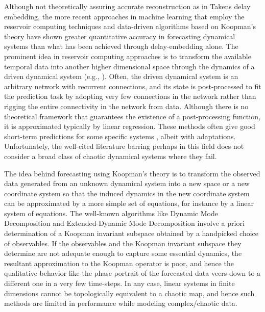 \documentclass[12 pt]{article}
\begin{document}
Although not theoretically assuring accurate reconstruction as in Takens delay embedding, the more recent approaches in machine learning that employ the reservoir computing techniques \cite{jaeger2004harnessing, lu2018attractor} and data-driven algorithms based on Koopman's theory \cite{koopman1932dynamical,budivsic2012applied}  have shown greater quantitative accuracy in forecasting dynamical systems than what has been achieved through delay-embedding alone. The prominent idea in reservoir computing approaches is to transform the available temporal data into another higher dimensional space through the dynamics of a driven dynamical system (e.g., \cite{Manju_ESP,manjunath2020stability}).  Often, the driven dynamical system is an arbitrary network with recurrent connections, and its state is post-processed to fit the prediction task by adopting very few connections in the network rather than rigging the entire connectivity in the network from data.  Although there is no theoretical framework that guarantees the existence of a post-processing function, it is approximated typically by linear regression. These methods often give good short-term predictions for some specific systems \cite{jaeger2004harnessing, lu2018attractor}, albeit with adaptations. Unfortunately, the well-cited literature barring perhaps \cite{herteux2020breaking,Manju_IEEE,wu2018statistical, faranda2019boosting} in this field does not consider a broad class of chaotic dynamical systems where they fail. 


The idea behind forecasting using 
Koopman's theory is to transform the observed data generated from an unknown dynamical system into a new space or a new coordinate system so that the induced dynamics in the new coordinate system can be approximated by a more simple set of equations, for instance by a linear system of equations. The well-known algorithms like Dynamic Mode Decomposition and Extended-Dynamic Mode Decomposition \cite{schmid2010dynamic,williams2015data} involve a priori determination of a Koopman invariant subspace obtained by a handpicked choice of observables. If the observables and the Koopman invariant subspace they determine are not adequate enough to capture some essential dynamics, the resultant approximation to the Koopman operator is poor, and hence the qualitative behavior like the phase portrait of the forecasted data veers down to a different one in a very few time-steps.  In any case, linear systems in finite dimensions cannot be topologically equivalent to a chaotic map, and hence such methods are limited in performance while modeling complex/chaotic data.   
\end{document}
